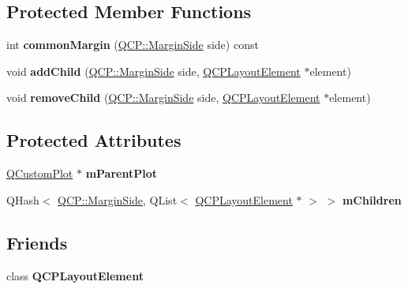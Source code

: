 \subsection*{Protected Member Functions}
\begin{DoxyCompactItemize}
\item 
\mbox{\label{class_q_c_p_margin_group_aea6a00373b3a0305de56c34d2423ea99}} 
int {\bfseries common\+Margin} (\mbox{\hyperlink{namespace_q_c_p_a7e487e3e2ccb62ab7771065bab7cae54}{Q\+C\+P\+::\+Margin\+Side}} side) const
\item 
\mbox{\label{class_q_c_p_margin_group_acb9c3a35acec655c2895b7eb95ee0524}} 
void {\bfseries add\+Child} (\mbox{\hyperlink{namespace_q_c_p_a7e487e3e2ccb62ab7771065bab7cae54}{Q\+C\+P\+::\+Margin\+Side}} side, \mbox{\hyperlink{class_q_c_p_layout_element}{Q\+C\+P\+Layout\+Element}} $\ast$element)
\item 
\mbox{\label{class_q_c_p_margin_group_a20ab3286062957d99b58db683fe725b0}} 
void {\bfseries remove\+Child} (\mbox{\hyperlink{namespace_q_c_p_a7e487e3e2ccb62ab7771065bab7cae54}{Q\+C\+P\+::\+Margin\+Side}} side, \mbox{\hyperlink{class_q_c_p_layout_element}{Q\+C\+P\+Layout\+Element}} $\ast$element)
\end{DoxyCompactItemize}
\subsection*{Protected Attributes}
\begin{DoxyCompactItemize}
\item 
\mbox{\label{class_q_c_p_margin_group_a23cfa29e3cc0f33a59141b77d8c04edf}} 
\mbox{\hyperlink{class_q_custom_plot}{Q\+Custom\+Plot}} $\ast$ {\bfseries m\+Parent\+Plot}
\item 
\mbox{\label{class_q_c_p_margin_group_a954bc89ff8958b9bb6a4a0d08ed5fc0f}} 
Q\+Hash$<$ \mbox{\hyperlink{namespace_q_c_p_a7e487e3e2ccb62ab7771065bab7cae54}{Q\+C\+P\+::\+Margin\+Side}}, Q\+List$<$ \mbox{\hyperlink{class_q_c_p_layout_element}{Q\+C\+P\+Layout\+Element}} $\ast$ $>$ $>$ {\bfseries m\+Children}
\end{DoxyCompactItemize}
\subsection*{Friends}
\begin{DoxyCompactItemize}
\item 
\mbox{\label{class_q_c_p_margin_group_a0790750c7e7f14fdbd960d172655b42b}} 
class {\bfseries Q\+C\+P\+Layout\+Element}
\end{DoxyCompactItemize}


